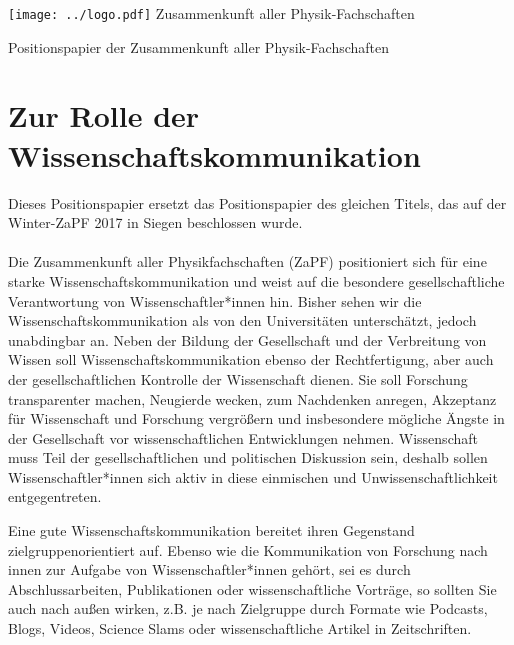 \documentclass[DIV=calc]{scrartcl}
\begin{document}
    \hspace{0.87\textwidth}
    \begin{minipage}{120pt}
        \vspace{-1.8cm}
        \texttt{[image: ../logo.pdf]}
        \centering
        \small Zusammenkunft aller Physik-Fachschaften
    \end{minipage}
    \begin{center}
        \huge{Positionspapier der Zusammenkunft aller Physik-Fachschaften}\vspace{.25\baselineskip}\\
        \normalsize
    \end{center}
    \vspace{1cm}

\section*{Zur Rolle der Wissenschaftskommunikation}

Dieses Positionspapier ersetzt das Positionspapier des gleichen Titels, das auf der Winter-ZaPF 2017 in Siegen beschlossen wurde.\\~\\
Die Zusammenkunft aller Physikfachschaften (ZaPF) positioniert sich für eine starke Wissenschaftskommunikation und weist auf die besondere gesellschaftliche Verantwortung von Wissenschaftler*innen hin.
Bisher sehen wir die Wissenschaftskommunikation als von den Universitäten unterschätzt, jedoch unabdingbar an.
Neben der Bildung der Gesellschaft und der Verbreitung von Wissen soll Wissenschaftskommunikation ebenso der Rechtfertigung, aber auch der gesellschaftlichen Kontrolle der Wissenschaft dienen.
Sie soll Forschung transparenter machen, Neugierde wecken, zum Nachdenken anregen, Akzeptanz für Wissenschaft und Forschung vergrößern und insbesondere mögliche Ängste in der Gesellschaft vor wissenschaftlichen Entwicklungen nehmen. 
Wissenschaft muss Teil der gesellschaftlichen und politischen Diskussion sein, deshalb sollen Wissenschaftler*innen sich aktiv in diese einmischen und  Unwissenschaftlichkeit entgegentreten.

Eine gute Wissenschaftskommunikation bereitet ihren Gegenstand zielgruppenorientiert auf. 
Ebenso wie die Kommunikation von Forschung nach innen zur Aufgabe von Wissenschaftler*innen gehört, sei es durch Abschlussarbeiten, Publikationen oder wissenschaftliche Vorträge, so sollten Sie auch nach außen wirken, z.B. je nach Zielgruppe durch Formate wie Podcasts, Blogs, Videos, Science Slams oder wissenschaftliche Artikel in Zeitschriften.\\
\end{document}
